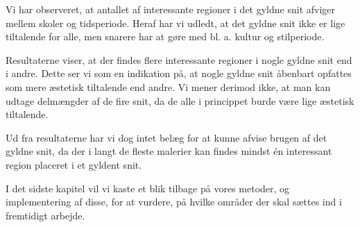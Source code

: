 {Vi har observeret, at antallet af interessante regioner i det gyldne
snit afviger mellem skoler og tidsperiode. Heraf har vi udledt, at det
gyldne snit ikke er lige tiltalende for alle, men snarere har at gøre
med bl. a. kultur og stilperiode.

Resultaterne viser, at der findes flere interessante regioner i nogle
gyldne snit end i andre. Dette ser vi som en indikation på, at nogle
gyldne snit åbenbart opfattes som mere æstetisk tiltalende end andre. Vi
mener derimod ikke, at man kan udtage delmængder af de fire snit, da de
alle i princippet burde være lige æstetisk tiltalende.

Ud fra resultaterne har vi dog intet belæg for at kunne afvise brugen af
det gyldne snit, da der i langt de fleste malerier kan findes mindst én
interessant region placeret i et gyldent snit.

I det sidste kapitel vil vi kaste et blik tilbage på vores metoder, og
implementering af disse, for at vurdere, på hvilke områder der skal
sættes ind i fremtidigt arbejde.

}
